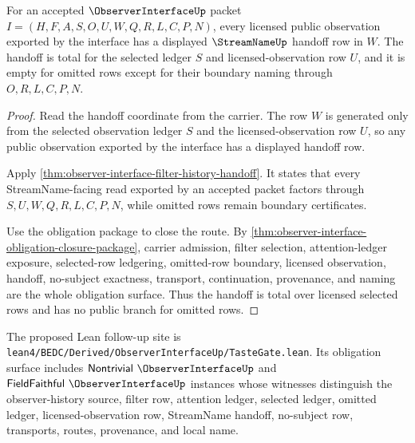 \begin{theorem}
\label{thm:observer-interface-streamname-handoff-totality}
For an accepted $\ObserverInterfaceUp$ packet $I=(H,F,A,S,O,U,W,Q,R,L,C,P,N)$, every licensed public observation exported by the interface has a displayed $\StreamNameUp$ handoff row in $W$. The handoff is total for the selected ledger $S$ and licensed-observation row $U$, and it is empty for omitted rows except for their boundary naming through $O,R,L,C,P,N$.
\end{theorem}
\begin{proof}
Read the handoff coordinate from the carrier. The row $W$ is generated only from the selected observation ledger $S$ and the licensed-observation row $U$, so any public observation exported by the interface has a displayed handoff row.

Apply \autoref{thm:observer-interface-filter-history-handoff}. It states that every StreamName-facing read exported by an accepted packet factors through $S,U,W,Q,R,L,C,P,N$, while omitted rows remain boundary certificates.

Use the obligation package to close the route. By \autoref{thm:observer-interface-obligation-closure-package}, carrier admission, filter selection, attention-ledger exposure, selected-row ledgering, omitted-row boundary, licensed observation, handoff, no-subject exactness, transport, continuation, provenance, and naming are the whole obligation surface. Thus the handoff is total over licensed selected rows and has no public branch for omitted rows.
\end{proof}



The proposed Lean follow-up site is \texttt{lean4/BEDC/Derived/ObserverInterfaceUp/TasteGate.lean}. Its obligation surface includes $\mathsf{Nontrivial}\ \ObserverInterfaceUp$ and $\mathsf{FieldFaithful}\ \ObserverInterfaceUp$ instances whose witnesses distinguish the observer-history source, filter row, attention ledger, selected ledger, omitted ledger, licensed-observation row, StreamName handoff, no-subject row, transports, routes, provenance, and local name.

